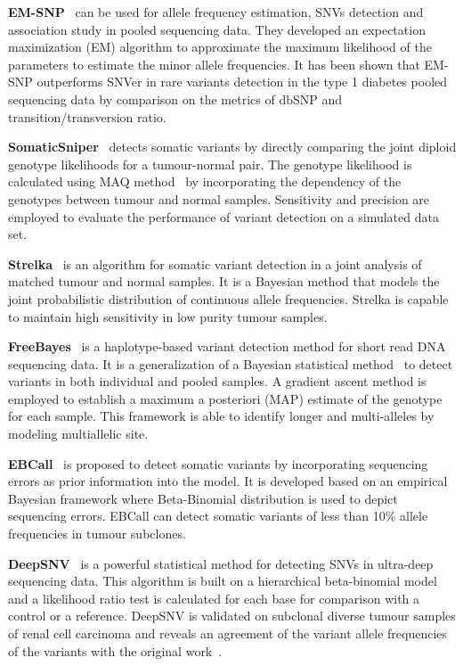 \documentclass[a4,center,fleqn]{NAR}
\begin{document}
\textbf{EM-SNP}~\citep{Chen2013} can be used for allele frequency estimation, SNVs detection and association study in pooled sequencing data.
They developed an expectation maximization (EM) algorithm to approximate the maximum likelihood of the parameters to estimate the minor allele frequencies.
It has been shown that EM-SNP outperforms SNVer in rare variants detection in the type 1 diabetes pooled sequencing data by comparison on the metrics of dbSNP and transition/transversion ratio.

\textbf{SomaticSniper}~\citep{Larson2012} detects somatic variants by directly comparing the joint diploid genotype likelihoods for a tumour-normal pair.
The genotype likelihood is calculated using MAQ method~\citep{Li2008} by incorporating the dependency of the genotypes between tumour and normal samples.
Sensitivity and precision are employed to evaluate the performance of variant detection on a simulated data set.

\textbf{Strelka}~\citep{Saunders2012} is an algorithm for somatic variant detection in a joint analysis of matched tumour and normal samples.
It is a Bayesian method that models the joint probabilistic distribution of continuous allele frequencies.
Strelka is capable to maintain high sensitivity in low purity tumour samples.

\textbf{FreeBayes}~\citep{Garrison2012} is a haplotype-based variant detection method for short read DNA sequencing data.
It is a generalization of a Bayesian statistical method~\citep{marth1999general} to detect variants in both individual and pooled samples.
A gradient ascent method is employed to establish a maximum a posteriori (MAP) estimate of the genotype for each sample.
This framework is able to identify longer and multi-alleles by modeling multiallelic site.

\textbf{EBCall}~\citep{Shiraishi2013} is proposed to detect somatic variants by incorporating sequencing errors as prior information into the model.
It is developed based on an empirical Bayesian framework where Beta-Binomial distribution is used to depict sequencing errors.
EBCall can detect somatic variants of less than 10\% allele frequencies in tumour subclones.

\textbf{DeepSNV}~\citep{gerstung2012reliable} is a powerful statistical method for detecting SNVs in ultra-deep sequencing data.
This algorithm is built on a hierarchical beta-binomial model and a likelihood ratio test is calculated for each base for comparison with a control or a reference.
DeepSNV is validated on subclonal diverse tumour samples of renal cell carcinoma and reveals an agreement of the variant allele frequencies of the variants with the original work~\citep{gerstung2012reliable}.
\end{document}
